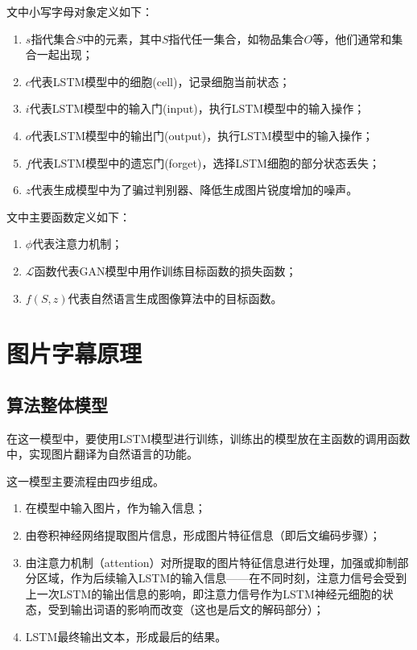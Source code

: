 文中小写字母对象定义如下：
\begin{enumerate}[fullwidth,itemindent=2em,label=\arabic*.]
    \item $s$指代集合$S$中的元素，其中$S$指代任一集合，如物品集合$O$等，他们通常和集合一起出现；
    \item $c$代表LSTM模型中的细胞(cell)，记录细胞当前状态；
    \item $i$代表LSTM模型中的输入门(input)，执行LSTM模型中的输入操作；
    \item $o$代表LSTM模型中的输出门(output)，执行LSTM模型中的输入操作；
    \item $f$代表LSTM模型中的遗忘门(forget)，选择LSTM细胞的部分状态丢失；
    \item $z$代表生成模型中为了骗过判别器、降低生成图片锐度增加的噪声。
\end{enumerate}

文中主要函数定义如下：
\begin{enumerate}[fullwidth,itemindent=2em,label=\arabic*.]
    \item $\phi$代表注意力机制；
    \item $\mathcal{L}$函数代表GAN模型中用作训练目标函数的损失函数；
    \item $f(S,z)$代表自然语言生成图像算法中的目标函数。
\end{enumerate}

\section{图片字幕原理}
\subsection{算法整体模型}
在这一模型中，要使用LSTM模型进行训练，训练出的模型放在主函数的调用函数中，实现图片翻译为自然语言的功能。

这一模型主要流程由四步组成。

\begin{enumerate}[fullwidth,itemindent=2em,label=\arabic*.]
    \item 在模型中输入图片，作为输入信息；
    \item 由卷积神经网络提取图片信息，形成图片特征信息（即后文编码步骤）；
    \item 由注意力机制（attention）对所提取的图片特征信息进行处理，加强或抑制部分区域，作为后续输入LSTM的输入信息——在不同时刻，注意力信号会受到上一次LSTM的输出信息的影响，即注意力信号作为LSTM神经元细胞的状态，受到输出词语的影响而改变（这也是后文的解码部分）；
    \item LSTM最终输出文本，形成最后的结果。
\end{enumerate}

